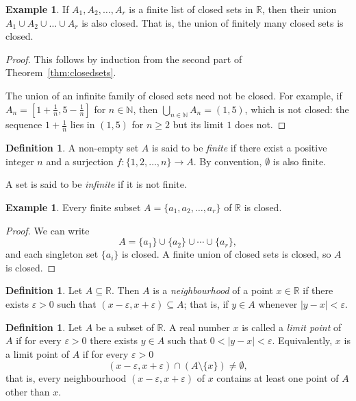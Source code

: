 \documentclass[11pt,a4paper]{article}
\numberwithin{equation}{section}
\theoremstyle{definition}
\newtheorem{defn}[thm]{Definition}
\newtheorem{exa}[thm]{Example}
\begin{document}
\begin{exa}
If $A_1, A_2, \dots , A_r$ is a finite list of closed sets in $\mathbb{R}$, then their union $A_1\cup A_2\cup \dots \cup A_r$ is also closed. That is, the union of finitely many closed sets is closed.
\end{exa}

\begin{proof}
This follows by induction from the second part of Theorem~\ref{thm:closedsets}.

The union of an infinite family of closed sets need not be closed. For example, if $A_n = \left[ 1 + \frac{1}{n}, 5 - \frac{1}{n}\right]$ for $n \in \mathbb{N}$, then $\bigcup_{n\in \mathbb{N}} A_n = (1,5)$, which is not closed: the sequence $1+\frac{1}{n}$ lies in $(1,5)$ for $n\geq 2$ but its limit $1$ does not.
\end{proof}


\begin{defn}
A non-empty set $A$ is said to be \emph{finite} if there exist a positive integer $n$ and a surjection $f:\{ 1, 2, \dots, n\} \longrightarrow A.$ By convention, $\emptyset$ is also finite.

A set is said to be \emph{infinite} if it is not finite.
\end{defn}


\begin{exa}
Every finite subset $A = \{ a_1, a_2, \dots , a_r\}$ of $\mathbb{R}$ is closed.
\end{exa}

\begin{proof}
We can write
$$A = \{a_1\} \cup \{ a_2\}\cup \cdots \cup \{ a_r\},$$
and each singleton set $\{a_i\}$ is closed. A finite union of closed sets is closed, so $A$ is closed.
\end{proof}


\begin{defn}
Let $A\subseteq \mathbb{R}$. Then $A$ is a \emph{neighbourhood} of a point $x\in \mathbb{R}$ if there exists $\varepsilon > 0$ such that $(x-\varepsilon, x + \varepsilon) \subseteq A$; that is, if $y \in A$ whenever $|y - x| < \varepsilon$.
\end{defn}


\begin{defn}
Let $A$ be a subset of $\mathbb{R}$. A real number $x$ is called a \emph{limit point} of $A$ if for every $\varepsilon > 0$ there exists $y \in A$ such that $0 < |y - x| < \varepsilon$. Equivalently, $x$ is a limit point of $A$ if for every $\varepsilon > 0$
$$(x-\varepsilon, x + \varepsilon) \cap (A \setminus \{x\}) \neq \emptyset,$$
that is, every neighbourhood $(x - \varepsilon, x + \varepsilon)$ of $x$ contains at least one point of $A$ other than $x$.
\end{defn}
\end{document}
